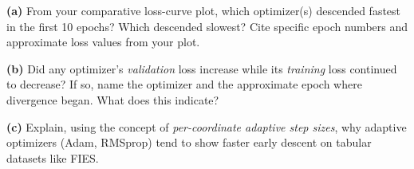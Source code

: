 \documentclass[12pt,a4paper]{article}
\begin{document}
\begin{tcolorbox}[colback=lightblue!40, colframe=myColorB,
  title={\textbf{Question 2 — Loss Landscape Observations} \hfill \normalfont(10 pts)},
  fonttitle=\normalsize\bfseries, breakable]

\textbf{(a)} From your comparative loss-curve plot, which optimizer(s) descended
fastest in the first 10 epochs? Which descended slowest?
Cite specific epoch numbers and approximate loss values from your plot.

\textbf{(b)} Did any optimizer's \emph{validation} loss increase while its
\emph{training} loss continued to decrease? If so, name the optimizer and the
approximate epoch where divergence began. What does this indicate?

\textbf{(c)} Explain, using the concept of \emph{per-coordinate adaptive step sizes},
why adaptive optimizers (Adam, RMSprop) tend to show faster early descent on
tabular datasets like FIES.
\end{tcolorbox}
\end{document}
